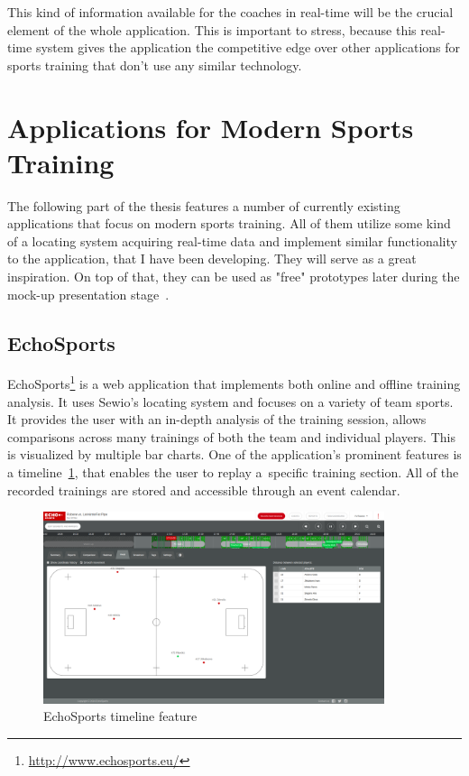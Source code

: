 This kind of information available for the coaches in real-time will be the crucial element of the whole application. This is important to stress, because this real-time system gives the application the competitive edge over other applications for sports training that don’t use any similar technology.

\section{Applications for Modern Sports Training}
The following part of the thesis features a number of currently existing applications that focus on modern sports training. All of them utilize some kind of a locating system acquiring real-time data and implement similar functionality to the application, that I have been developing. They will serve as a great inspiration. On top of that, they can be used as "free" prototypes later during the mock-up presentation stage~\cite{Krug}.

\subsection{EchoSports}
EchoSports\footnote{\url{http://www.echosports.eu/}} is a web application that implements both online and offline training analysis. It uses Sewio’s locating system and focuses on a variety of team sports. It provides the user with an in-depth analysis of the training session, allows comparisons across many trainings of both the team and individual players. This is visualized by multiple bar charts. One of the application’s prominent features is a timeline~\ref{img:echosports}, that enables the user to replay a~specific training section. All of the recorded trainings are stored and accessible through an event calendar.

\begin{figure}[htb]
\begin{center}
  \includegraphics*[width=10cm,keepaspectratio]{images/echosports}
\end{center}
\caption{EchoSports timeline feature}
\label{img:echosports}
\end{figure}

